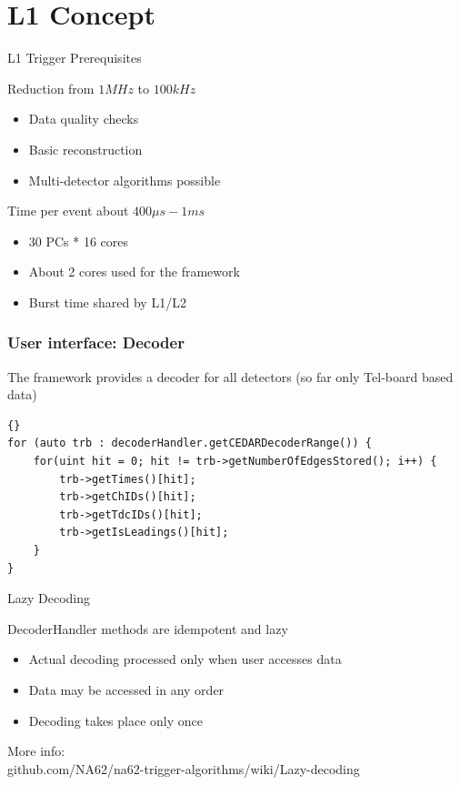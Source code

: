 \section*{L1 Concept}

\begin{frame}{L1 Trigger Prerequisites}{}
	\begin{block}{Reduction from $1 MHz$ to $100 kHz$}
		\begin{itemize}
	  		\item Data quality checks
	  		\item Basic reconstruction
	  		\item Multi-detector algorithms possible
		\end{itemize}
	\end{block}
	
	\begin{exampleblock}{Time per event about $400\mu s - 1 ms$}
		\begin{itemize}
	  		\item 30 PCs * 16 cores
	  		\item About 2 cores used for the framework
	  		\item Burst time shared by L1/L2 
		\end{itemize}
	\end{exampleblock}
\end{frame}


\begin{frame}[fragile]
\frametitle{User interface: Decoder}
The framework provides a decoder for all detectors (so far only Tel-board based
data)

\begin{lstlisting}[frame=trBL,caption={}]{}
for (auto trb : decoderHandler.getCEDARDecoderRange()) {
    for(uint hit = 0; hit != trb->getNumberOfEdgesStored(); i++) {
        trb->getTimes()[hit];
        trb->getChIDs()[hit];
        trb->getTdcIDs()[hit];
        trb->getIsLeadings()[hit];
    }
}
\end{lstlisting}	
\end{frame}

\begin{frame}{Lazy Decoding}{}
	\begin{block}{DecoderHandler methods are idempotent and lazy}
		\begin{itemize}
	  		\item Actual decoding processed only when user accesses data
	  		\item Data may be accessed in any order
	  		\item Decoding takes place only once
		\end{itemize}
	\end{block}
	\vspace{0.5cm}
	More info: \\
	github.com/NA62/na62-trigger-algorithms/wiki/Lazy-decoding
\end{frame}

